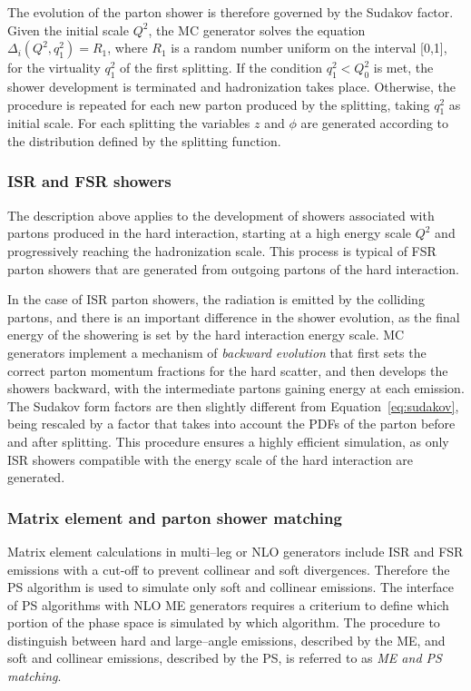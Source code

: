 The evolution of the parton shower is therefore governed by the
Sudakov factor. Given the initial scale $Q^2$, the MC generator solves
the equation $\Delta_i(Q^2, q_1^2)=R_1$, where $R_1$ is a random
number uniform on the interval [0,1], for the virtuality $q_1^2$ of
the first splitting. If the condition $q_1^2<Q_0^2$ is met, the shower
development is terminated and hadronization takes place. Otherwise,
the procedure is repeated for each new parton produced by the
splitting, taking $q_1^2$ as initial scale.
For each splitting the variables $z$ and $\phi$ are generated
according to the distribution defined by the splitting function.

\subsubsection{ISR and FSR showers}
\label{sec:isrfsr}

The description above applies to the development of showers
associated with partons produced in the hard interaction, starting at
a high energy scale $Q^2$ and progressively reaching the hadronization
scale. This process is typical of FSR parton showers that are
generated from outgoing partons of the hard interaction.

In the case of ISR parton showers, the radiation is emitted by the
colliding partons, and there is an important difference in the shower
evolution, as the final energy of the showering is set by the hard
interaction energy scale.
MC generators implement a mechanism of {\it backward evolution} that
first sets the correct parton momentum fractions for the hard scatter,
and then develops the showers backward, with the intermediate partons
gaining energy at each emission. The Sudakov form factors are then
slightly different from Equation~\ref{eq:sudakov}, being rescaled by a
factor that takes into account the PDFs of the parton before and after
splitting. This procedure ensures a highly efficient simulation, as
only ISR showers compatible with the energy scale of the hard
interaction are generated. 

\subsubsection{Matrix element and parton shower matching}
\label{sec:matching}
 
Matrix element calculations in multi--leg or NLO generators include
ISR and FSR emissions with a cut-off to prevent collinear
and soft divergences. Therefore the PS algorithm is used to simulate
only soft and collinear emissions.
The interface of PS algorithms with NLO ME generators requires a
criterium to define which portion of the phase space is simulated by
which algorithm. The procedure to distinguish between hard and
large--angle emissions, described by the ME, and soft and collinear
emissions, described by the PS, is referred to as {\it ME and PS
  matching}.

